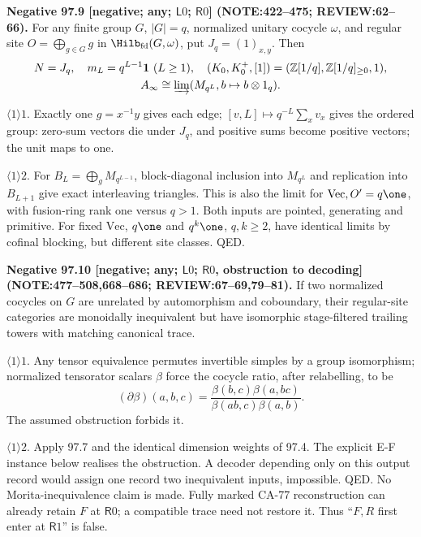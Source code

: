 \textbf{Negative 97.9 [negative; any; \(\mathsf L0\); \(\mathsf R0\)] (NOTE:422--475; REVIEW:62--66).}
For any finite group \(G\), \(|G|=q\), normalized unitary cocycle \(\omega\), and regular site
\(O=\bigoplus_{g\in G}g\) in \(\Hilb_{\mathrm{fd}}(G,\omega)\), put \(J_q=(1)_{x,y}\). Then
\[\begin{gathered}
 N=J_q,\quad m_L=q^{L-1}\mathbf1\ (L\ge1),\quad (K_0,K_0^+,[1])=(\mathbb Z[1/q],\mathbb Z[1/q]_{\ge0},1),\\
 A_\infty\cong\varinjlim(M_{q^L},b\mapsto b\otimes1_q).
\end{gathered}\]
\par\(\langle1\rangle1\). Exactly one \(g=x^{-1}y\) gives each edge; \([v,L]\mapsto q^{-L}\sum_xv_x\) gives the
ordered group: zero-sum vectors die under \(J_q\), and positive sums become positive vectors; the unit maps to one.
\par\(\langle1\rangle2\). For \(B_L=\bigoplus_gM_{q^{L-1}}\), block-diagonal inclusion into \(M_{q^L}\) and replication
into \(B_{L+1}\) give exact interleaving triangles. This is also the limit for \(\mathrm{Vec},O'=q\one\), with fusion-ring
rank one versus \(q>1\). Both inputs are pointed, generating and primitive. For fixed \(\mathrm{Vec}\), \(q\one\) and
\(q^k\one\), \(q,k\ge2\), have identical limits by cofinal blocking, but different site classes. QED.

\textbf{Negative 97.10 [negative; any; \(\mathsf L0\); \(\mathsf R0\), obstruction to decoding] (NOTE:477--508,668--686; REVIEW:67--69,79--81).}
If two normalized cocycles on \(G\) are unrelated by automorphism and coboundary, their regular-site categories are
monoidally inequivalent but have isomorphic stage-filtered trailing towers with matching canonical trace.
\par\(\langle1\rangle1\). Any tensor equivalence permutes invertible simples by a group isomorphism; normalized
tensorator scalars \(\beta\) force the cocycle ratio, after relabelling, to be
\[(\partial\beta)(a,b,c)=\frac{\beta(b,c)\beta(a,bc)}{\beta(ab,c)\beta(a,b)}.\] The assumed obstruction forbids it.
\par\(\langle1\rangle2\). Apply 97.7 and the identical dimension weights of 97.4. The explicit E-F instance below
realises the obstruction. A decoder depending only on this output record would assign one record two inequivalent
inputs, impossible. QED. No Morita-inequivalence claim is made. Fully marked CA-77 reconstruction can already retain
\(F\) at \(\mathsf R0\); a compatible trace need not restore it. Thus ``\(F,R\) first enter at \(\mathsf R1\)'' is false.

